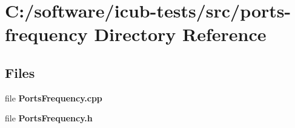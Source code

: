 \section{C\+:/software/icub-\/tests/src/ports-\/frequency Directory Reference}
\label{dir_d6cc1804077fb7a0bee471bebe09c948}
\subsection*{Files}
\begin{DoxyCompactItemize}
\item 
file {\bfseries Ports\+Frequency.\+cpp}
\item 
file {\bfseries Ports\+Frequency.\+h}
\end{DoxyCompactItemize}
